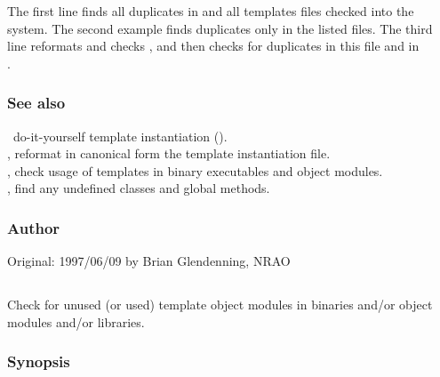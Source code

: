 The first line finds all duplicates in  and all templates
files checked into the system. The second example finds duplicates only in
the listed files. The third line reformats and checks , and
then checks for duplicates in this file and in \\
.

\subsubsection*{See also}

\aipspp\ do-it-yourself template instantiation ().\\
, reformat in canonical form the template instantiation file.\\
, check usage of templates in binary executables and object
modules.\\
, find any undefined classes and global methods.

\subsubsection*{Author}

Original: 1997/06/09 by Brian Glendenning, NRAO


\newpage
\subsection{}
\label{unused}

Check for unused (or used) template object modules in binaries and/or object
modules and/or libraries.

\subsubsection*{Synopsis}

\begin{synopsis}
\end{synopsis}

